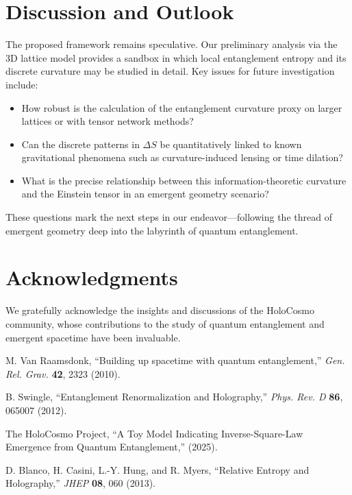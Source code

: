 \documentclass[12pt]{article}
\begin{document}
\section{Discussion and Outlook}
The proposed framework remains speculative. Our preliminary analysis via the 3D lattice model provides a sandbox in which local entanglement entropy and its discrete curvature may be studied in detail. Key issues for future investigation include:
\begin{itemize}
  \item How robust is the calculation of the entanglement curvature proxy on larger lattices or with tensor network methods?
  \item Can the discrete patterns in $\Delta S$ be quantitatively linked to known gravitational phenomena such as curvature-induced lensing or time dilation?
  \item What is the precise relationship between this information-theoretic curvature and the Einstein tensor in an emergent geometry scenario?
\end{itemize}
These questions mark the next steps in our endeavor—following the thread of emergent geometry deep into the labyrinth of quantum entanglement.

\section*{Acknowledgments}
We gratefully acknowledge the insights and discussions of the HoloCosmo community, whose contributions to the study of quantum entanglement and emergent spacetime have been invaluable.

\begin{thebibliography}{9}

M. Van Raamsdonk, ``Building up spacetime with quantum entanglement,'' \emph{Gen. Rel. Grav.} \textbf{42}, 2323 (2010).

B. Swingle, ``Entanglement Renormalization and Holography,'' \emph{Phys. Rev. D} \textbf{86}, 065007 (2012).

The HoloCosmo Project, ``A Toy Model Indicating Inverse-Square-Law Emergence from Quantum Entanglement,'' (2025).

D. Blanco, H. Casini, L.-Y. Hung, and R. Myers, ``Relative Entropy and Holography,'' \emph{JHEP} \textbf{08}, 060 (2013).

\end{thebibliography}
\end{document}
